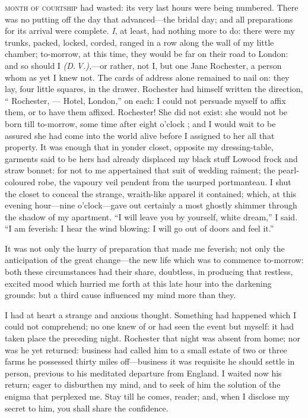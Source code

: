 
 \textsc{month of courtship} had wasted: its very last hours were being
numbered.  There was no putting off the day that advanced---the bridal
day; and all preparations for its arrival were complete.  \emph{I}, at
least, had nothing more to do: there were my trunks, packed, locked,
corded, ranged in a row along the wall of my little chamber; to-morrow,
at this time, they would be far on their road to London: and so should I
\emph{(D.\,V.),}---or rather, not I, but one Jane Rochester, a person whom as yet
I knew not.  The cards of address alone remained to nail on: they lay,
four little squares, in the drawer.  \Mr{} Rochester had himself written
the direction, \enquote{\Mrs{} Rochester, --- Hotel, London,} on each: I
could not persuade myself to affix them, or to have them affixed.  \Mrs{}
 Rochester!  She did not exist: she would not be born till to-morrow,
some time after eight o'clock \AM; and I would wait to be assured she
had come into the world alive before I assigned to her all that
property.  It was enough that in yonder closet, opposite my
dressing-table, garments said to be hers had already displaced my black
stuff Lowood frock and straw bonnet: for not to me appertained that suit
of wedding raiment; the pearl-coloured robe, the vapoury veil pendent
from the usurped portmanteau.  I shut the closet to conceal the strange,
wraith-like apparel it contained; which, at this evening hour---nine
o'clock---gave out certainly a most ghostly shimmer through the shadow
of my apartment.  \enquote{I will leave you by yourself, white dream,} I
said.  \enquote{I am feverish: I hear the wind blowing: I will go out of
doors and feel it.}

It was not only the hurry of preparation that made me feverish; not only
the anticipation of the great change---the new life which was to
commence to-morrow: both these circumstances had their share, doubtless,
in producing that restless, excited mood which hurried me forth at this
late hour into the darkening grounds: but a third cause influenced my
mind more than they.

I had at heart a strange and anxious thought.  Something had happened
which I could not comprehend; no one knew of or had seen the event but
myself: it had taken place the preceding night.  \Mr{} Rochester that
night was absent from home; nor was he yet returned: business had called
him to a small estate of two or three farms he possessed thirty miles
off---business it was requisite he should settle in person, previous to
his meditated departure from England.  I waited now his return; eager to
disburthen my mind, and to seek of him the solution of the enigma that
perplexed me.  Stay till he comes, reader; and, when I disclose my
secret to him, you shall share the confidence.


